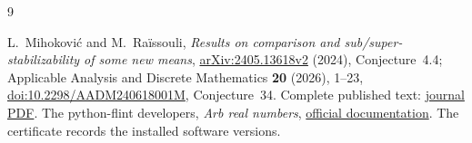\documentclass[11pt]{article}
\begin{document}
\begin{thebibliography}{9}
\raggedright
{}
L.~Mihokovi\'c and M.~Ra\"issouli,
\emph{Results on comparison and sub/super-stabilizability of some new means},
\href{https://arxiv.org/abs/2405.13618}{arXiv:2405.13618v2} (2024),
Conjecture~4.4; Applicable Analysis and Discrete Mathematics
\textbf{20} (2026), 1--23,
\href{https://doi.org/10.2298/AADM240618001M}{doi:10.2298/AADM240618001M},
Conjecture~34.
Complete published text:
\href{http://pefmath.etf.rs/vol20num1/AADM-Vol20-No1-1-23.pdf}{journal PDF}.
The python-flint developers, \emph{Arb real numbers},
\href{https://python-flint.readthedocs.io/en/latest/arb.html}{official documentation}.
The certificate records the installed software versions.
\end{thebibliography}
\end{document}
